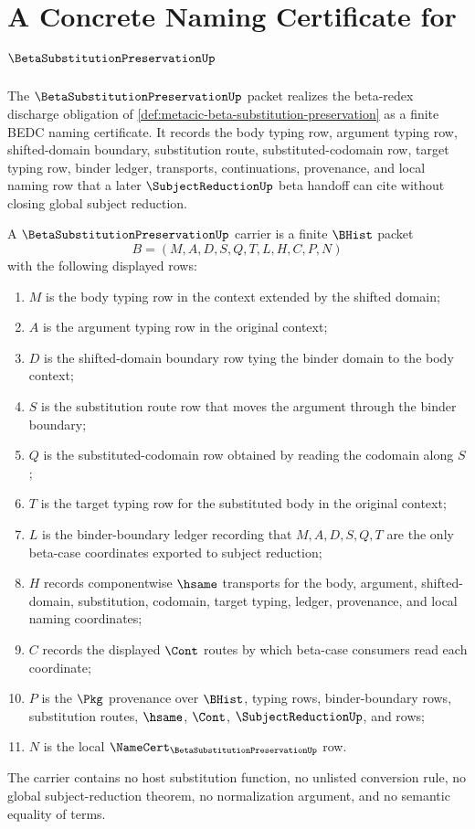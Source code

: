 \chapter{A Concrete Naming Certificate for $\BetaSubstitutionPreservationUp$}
\label{ch:concrete-instances-betasubstitutionpreservation-namecert}

The $\BetaSubstitutionPreservationUp$ packet realizes the beta-redex discharge obligation of \autoref{def:metacic-beta-substitution-preservation} as a finite BEDC naming certificate. It records the body typing row, argument typing row, shifted-domain boundary, substitution route, substituted-codomain row, target typing row, binder ledger, transports, continuations, provenance, and local naming row that a later $\SubjectReductionUp$ beta handoff can cite without closing global subject reduction.

\begin{definition}
\label{def:beta-substitution-preservation-carrier}
A $\BetaSubstitutionPreservationUp$ carrier is a finite $\BHist$ packet
$$
B=(M,A,D,S,Q,T,L,H,C,P,N)
$$
with the following displayed rows:
\begin{enumerate}
\item $M$ is the body typing row in the context extended by the shifted domain;
\item $A$ is the argument typing row in the original context;
\item $D$ is the shifted-domain boundary row tying the binder domain to the body context;
\item $S$ is the substitution route row that moves the argument through the binder boundary;
\item $Q$ is the substituted-codomain row obtained by reading the codomain along $S$;
\item $T$ is the target typing row for the substituted body in the original context;
\item $L$ is the binder-boundary ledger recording that $M,A,D,S,Q,T$ are the only beta-case coordinates exported to subject reduction;
\item $H$ records componentwise $\hsame$ transports for the body, argument, shifted-domain, substitution, codomain, target typing, ledger, provenance, and local naming coordinates;
\item $C$ records the displayed $\Cont$ routes by which beta-case consumers read each coordinate;
\item $P$ is the $\Pkg$ provenance over $\BHist$, typing rows, binder-boundary rows, substitution routes, $\hsame$, $\Cont$, $\SubjectReductionUp$, and \NameCert{} rows;
\item $N$ is the local $\NameCert_{\BetaSubstitutionPreservationUp}$ row.
\end{enumerate}
The carrier contains no host substitution function, no unlisted conversion rule, no global subject-reduction theorem, no normalization argument, and no semantic equality of terms.
\end{definition}

